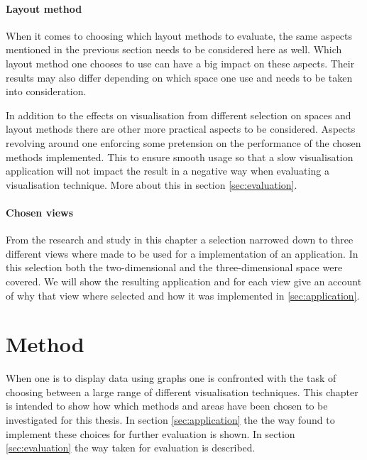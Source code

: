 \documentclass[a4paper,11pt]{kth-mag}
\begin{document}
\subsubsection{Layout method}
When it comes to choosing which layout methods to evaluate, the same aspects mentioned in the previous section needs to be considered here as well. Which layout method one chooses to use can have a big 
impact on these aspects. Their results may also differ depending on which space one use and needs to be taken into consideration.

In addition to the effects on visualisation from different selection on spaces and layout methods there are other more practical aspects to be considered. Aspects revolving around one enforcing some pretension
 on the performance of the chosen methods implemented. This to ensure smooth usage so that a slow visualisation application will not impact the result in a negative way when evaluating a visualisation technique.
 More about this in section \ref{sec:evaluation}.
 
\subsubsection{Chosen views}
\label{chosen-views}
From the research and study in this chapter a selection narrowed down to three different views where made to be used for a implementation of an application. In this selection both the two-dimensional and the 
three-dimensional space were covered. We will show the resulting application and for each view give an account of why that view where selected and how it was implemented in \ref{sec:application}.

\chapter{Method}
\label{chap:three}
When one is to display data using graphs one is confronted with the task of choosing between a large range of different visualisation techniques.
This chapter is intended to show how which methods and areas have been chosen to be investigated for this thesis. In section \ref{sec:application} 
the the way found to implement these choices for further evaluation is shown. In section \ref{sec:evaluation} the way taken for evaluation is described.
\end{document}
